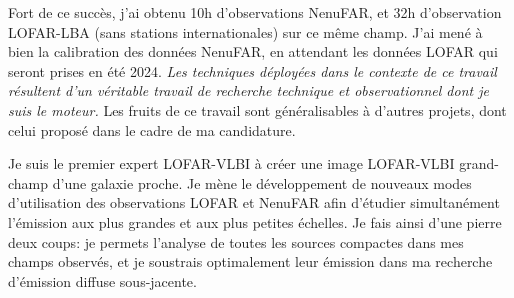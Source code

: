 \pg
Fort de ce succ\`es, j'ai obtenu 10h d'observations NenuFAR, et 32h d'observation LOFAR-LBA (sans stations internationales) sur ce m\^eme champ. J'ai men\'e \`a bien la calibration des donn\'ees NenuFAR, en attendant les donn\'ees LOFAR qui seront prises en \'et\'e 2024. \textit{Les techniques d\'eploy\'ees dans le contexte de ce travail r\'esultent d'un v\'eritable travail de recherche technique et observationnel dont je suis le moteur.} Les fruits de ce travail sont g\'en\'eralisables \`a d'autres projets, dont celui propos\'e dans le cadre de ma candidature.

%
%	

\begin{tcolorbox}[colback=green!10, colframe=green!50!black, arc=3mm, boxrule=1pt]
	Je suis le premier expert LOFAR-VLBI \`a cr\'eer une image LOFAR-VLBI grand-champ d'une galaxie proche. Je m\`ene le d\'eveloppement de nouveaux modes d'utilisation des observations LOFAR et NenuFAR afin d'\'etudier simultan\'ement l'\'emission aux plus grandes et aux plus petites \'echelles. Je fais ainsi d'une pierre deux coups: je permets l'analyse de toutes les sources compactes dans mes champs observ\'es, et je soustrais optimalement leur \'emission dans ma recherche d'\'emission diffuse sous-jacente.
\end{tcolorbox}

